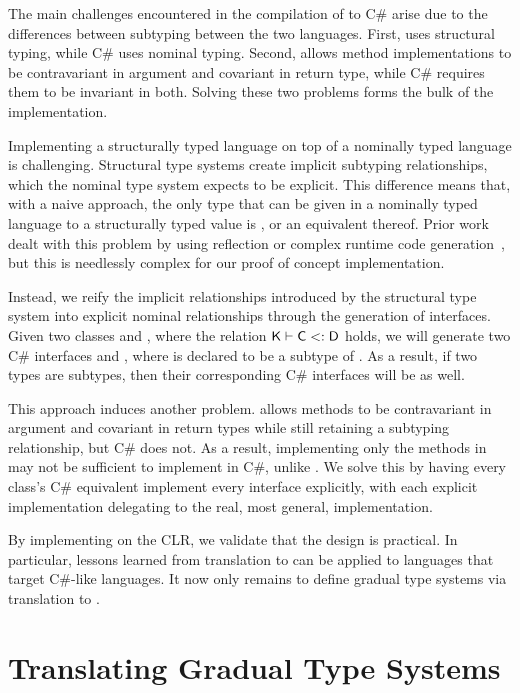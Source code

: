 \documentclass[a4paper,USenglish]{tex/lipics-v2016}
\begin{document}
The main challenges encountered in the compilation of \kafka to C\# arise due
to the differences between subtyping between the two languages. First, \kafka
uses structural typing, while C\# uses nominal typing. Second, \kafka allows
method implementations to be contravariant in argument and covariant in return
type, while C\# requires them to be invariant in both. Solving these two
problems  forms the bulk of the implementation.

Implementing a structurally typed language on top of a nominally typed
language is challenging. Structural type systems create implicit subtyping
relationships, which the nominal type system expects to be explicit. This
difference means that, with a naive approach, the only type that can be given
in a nominally typed language to a structurally typed value is , or
an equivalent thereof. Prior work dealt with this problem by using reflection
or complex runtime code generation~\cite{StructuralTypesOnJVM}, but this is
needlessly complex for our proof of concept implementation.

Instead, we reify the implicit relationships introduced by the structural type
system into explicit nominal relationships through the generation of
interfaces. Given two \kafka classes \C and \D, where the relation $\K\vdash
\C \Sub \D$ holds, we will generate two C\# interfaces  and , 
where  is declared to be a subtype of . As a result, if two
\kafka types are subtypes, then their corresponding C\# interfaces will be
as well.

This approach induces another problem. \kafka allows methods to be
contravariant in argument and covariant in return types while still retaining
a subtyping relationship, but C\# does not. As a result, implementing only the
methods in  may not be sufficient to implement  in C\#, unlike
\kafka. We solve this by having every \kafka class's C\# equivalent implement
every interface explicitly, with each explicit implementation delegating to
the real, most general, implementation.

By implementing \kafka on the CLR, we validate that the \kafka design is
practical. In particular, lessons learned from translation to \kafka can be
applied to languages that target C\#-like languages. It now only remains to
define gradual type systems via translation to \kafka.

\section{Translating Gradual Type Systems}
\end{document}
